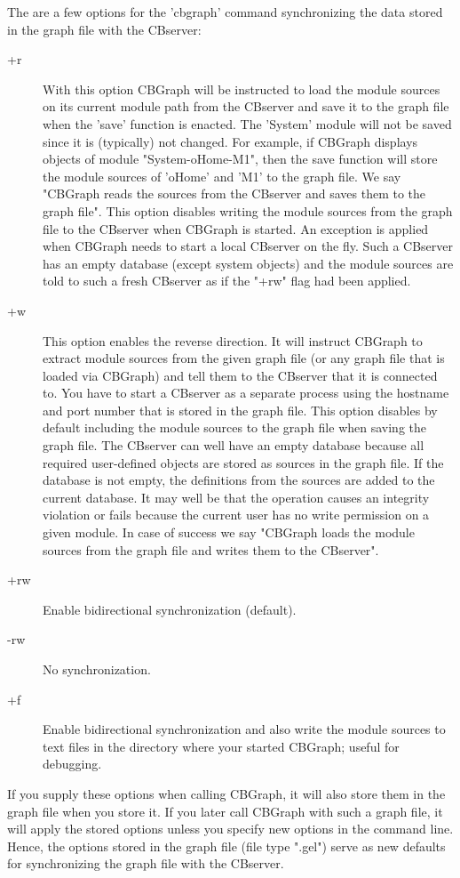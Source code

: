 The are a few options for the 'cbgraph' command synchronizing the data stored in the graph file
with the CBserver:
\begin{description}
\item[+r] With this option CBGraph will be instructed to load the module sources on its current module
  path from the CBserver and save it to the graph file when the 'save' function is enacted. 
  The 'System'  module will not be saved since it is (typically) not changed. For example, if CBGraph 
  displays objects of module "System-oHome-M1", then the save function will store the module sources
  of 'oHome'  and 'M1'  to the graph file. We say "CBGraph reads the sources from the CBserver and
  saves them to the graph file". This option disables writing the module sources from the graph file to the 
  CBserver when CBGraph is started. An exception is applied when CBGraph needs to start a local 
  CBserver on the fly. Such a CBserver has an empty database (except system objects) and
  the module sources are told to such a fresh CBserver as if the "+rw" flag had been applied.
\item[+w] This option enables the reverse direction. It will instruct CBGraph to extract module sources
  from the given graph file (or any graph file that is loaded via CBGraph) and tell them to the CBserver
  that it is connected to. You have to start a CBserver as a separate process using the hostname and
  port number that is stored in the graph file. This option disables by default including the module
  sources to the graph file when saving the graph file.
  The CBserver can well have an empty database because all required user-defined objects are stored
  as sources in the graph file. If the database is not empty, the definitions from the sources are
  added to the current database. It may well be that the operation causes an integrity violation or
  fails because the current user has no write permission on a given module. 
  In case of success we say "CBGraph loads the module sources from the graph file and writes
  them to the CBserver".
\item[+rw] Enable bidirectional synchronization  (default).
\item[-rw] No synchronization.
\item[+f]  Enable bidirectional synchronization and also write the module sources to text files in the directory
   where your started CBGraph; useful for debugging.
\end{description}

If you supply these options when calling CBGraph, it will also store them in the graph file when you store it.
If you later call CBGraph with such a graph file, it will apply the stored options unless you specify
new options in the command line. Hence, the options stored in the graph file (file type ".gel") serve as new defaults for
synchronizing the graph file with the CBserver.

